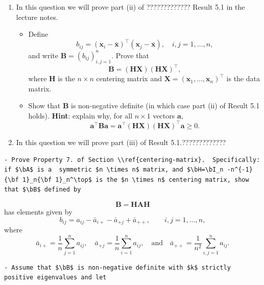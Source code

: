 \documentclass[]{book}
\providecommand{\tightlist}{%
  \setlength{\itemsep}{0pt}\setlength{\parskip}{0pt}}
\theoremstyle{definition}
\theoremstyle{definition}
\theoremstyle{definition}
\theoremstyle{remark}
\begin{document}
\begin{enumerate}
\def\labelenumi{\arabic{enumi}.}
\tightlist
\item
  In this question we will prove part (ii) of ????????????? Result 5.1 in the lecture notes.

  \begin{itemize}
  \tightlist
  \item
    Define
    \[
    b_{ij}=(\boldsymbol x_i-\bar{\boldsymbol x})^\top (\boldsymbol x_j-\bar{\boldsymbol x}), \quad i,j=1, \ldots , n,
    \]
    and write \(\boldsymbol B=(b_{ij})_{i,j=1}^n\). Prove that \[\boldsymbol B=(\boldsymbol H\boldsymbol X)(\boldsymbol H\boldsymbol X)^\top,\] where
    \(\boldsymbol H\) is the \(n \times n\) centering matrix and \(\boldsymbol X= (\boldsymbol x_1, \ldots , \boldsymbol x_n)^\top\) is the data matrix.
  \item
    Show that \(\boldsymbol B\) is non-negative definite (in which case part (ii) of Result 5.1 holds). \textbf{Hint}: explain why, for
    all \(n \times 1\) vectors \(\boldsymbol a\),
    \[
    \boldsymbol a^\top \boldsymbol B\boldsymbol a=\boldsymbol a^\top (\boldsymbol H\boldsymbol X) (\boldsymbol H\boldsymbol X)^\top \boldsymbol a\geq 0. 
    \]
  \end{itemize}
\item
  In this question we will prove part (iii) of Result 5.1.?????????????
\end{enumerate}

\begin{verbatim}
- Prove Property 7. of Section \\ref{centering-matrix}.  Specifically: if $\bA$ is a  symmetric $n \times n$ matrix, and $\bH=\bI_n -n^{-1} {\bf 1}_n{\bf 1}_n^\top$ is the $n \times n$ centering matrix, show that $\bB$ defined by
\end{verbatim}

\[\boldsymbol B= \boldsymbol H\boldsymbol A\boldsymbol H\]
has elements given by
\[
b_{ij}=a_{ij}-\bar{a}_{i+}-\bar{a}_{+j}+\bar{a}_{++},  \qquad i,j=1, \ldots , n,
\]
where\\
\[\bar{a}_{i+}= \frac{1}{n} \sum_{j=1}^n a_{ij}, \quad \bar{a}_{+j}=\frac{1}{n} \sum_{i=1}^n a_{ij}, \quad\mbox{and} \quad\bar{a}_{++} = \frac{1}{n^2} \sum_{i,j=1}^n a_{ij}.\]

\begin{verbatim}
- Assume that $\bB$ is non-negative definite with $k$ strictly positive eigenvalues and let
\end{verbatim}
\end{document}
